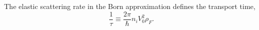 \documentclass{article}
\begin{document}
The elastic scattering rate in the Born approximation defines the transport time,
\begin{equation}
\frac{1}{\tau} \equiv \frac{2\pi}{\hbar} n_i V_0^2 \rho_F .
\label{eq:tau}
\end{equation}
\end{document}
